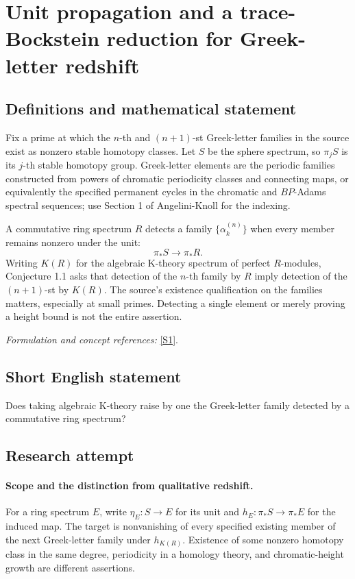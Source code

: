 \documentclass[11pt]{article}
\begin{document}
\section*{\texorpdfstring{Unit propagation and a trace-Bockstein reduction for Greek-letter redshift}{Unit propagation and a trace-Bockstein reduction for Greek-letter redshift}}\label{statement}
\subsection{Definitions and mathematical statement}
Fix a prime at which the $n$-th and $(n+1)$-st Greek-letter families in the source exist as nonzero stable homotopy classes. Let $S$ be the sphere spectrum, so $\pi_jS$ is its $j$-th stable homotopy group. Greek-letter elements are the periodic families constructed from powers of chromatic periodicity classes and connecting maps, or equivalently the specified permanent cycles in the chromatic and $BP$-Adams spectral sequences; use Section 1 of Angelini-Knoll for the indexing.

A commutative ring spectrum $R$ detects a family $\{\alpha_k^{(n)}\}$ when every member remains nonzero under the unit:
\[
 \pi_*S\longrightarrow\pi_*R.
\]
Writing $K(R)$ for the algebraic K-theory spectrum of perfect $R$-modules, Conjecture 1.1 asks that detection of the $n$-th family by $R$ imply detection of the $(n+1)$-st by $K(R)$. The source's existence qualification on the families matters, especially at small primes. Detecting a single element or merely proving a height bound is not the entire assertion.
\par\smallskip\textit{Formulation and concept references:} \href{https://arxiv.org/abs/1810.10088}{[S1]}.

\subsection{Short English statement}
Does taking algebraic K-theory raise by one the Greek-letter family detected by a commutative ring spectrum?
\subsection{Research attempt}

\paragraph{Scope and the distinction from qualitative redshift.}
For a ring spectrum $E$, write $\eta_E:S\to E$ for its unit and
$h_E:\pi_*S\to\pi_*E$ for the induced map. The target is nonvanishing
of every specified existing member of the next Greek-letter family
under $h_{K(R)}$. Existence of some nonzero homotopy class in the same
degree, periodicity in a homology theory, and chromatic-height growth
are different assertions.
\end{document}
